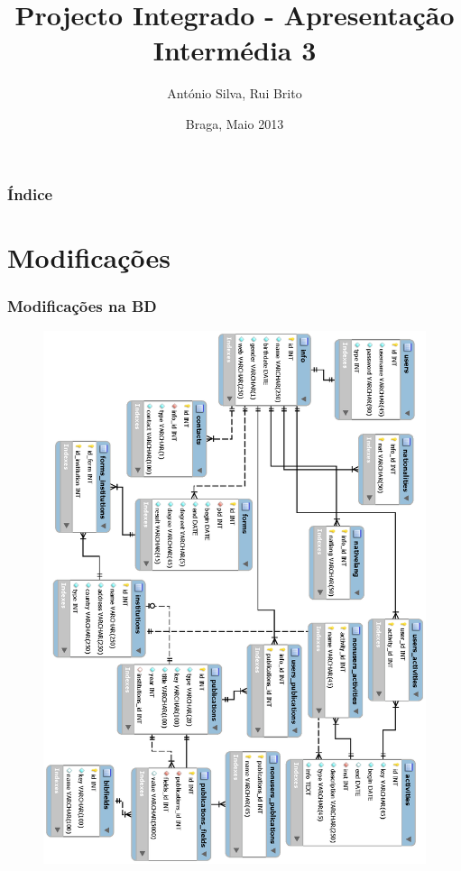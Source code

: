 \documentclass{beamer}
\title{Projecto Integrado - Apresentação Intermédia 3}
\author{António Silva, Rui Brito}
\institute[pg22820, pg22781]{
	Universidade do Minho
}
\date{Braga, Maio 2013}
\begin{document}

\maketitle%

\begin{frame}
	\frametitle{Índice}
	\tableofcontents
\end{frame}

\section{Modificações}
\begin{frame}
	\frametitle{Modificações na BD}

	\begin{figure}[!htp]
		\includegraphics[totalheight=1.2\textheight,angle=90]{../bd3.eps}		
		\end{figure}

\end{frame}
\end{document}
